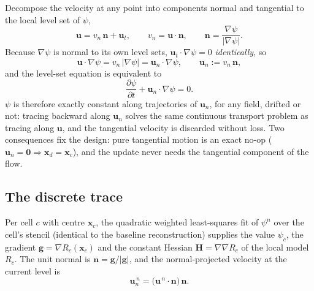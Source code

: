 \documentclass[preprint,3p,11pt]{elsarticle}
\newcommand{\psilev}{\psi}
\newcommand{\xc}{\mathbf{x}_c}
\newcommand{\xd}{\mathbf{x}_d}
\newcommand{\uvec}{\mathbf{u}}
\newcommand{\un}{\mathbf{u}_n}
\newcommand{\nv}{\mathbf{n}}
\newcommand{\gv}{\mathbf{g}}
\newcommand{\Hm}{\mathbf{H}}
\newcommand{\gradpsi}{\lvert\nabla\psilev\rvert}
\begin{document}
Decompose the velocity at any point into components normal and tangential to
the local level set of $\psilev$,
\begin{equation}
  \uvec = v_n\,\nv + \uvec_t,
  \qquad v_n=\uvec\cdot\nv,
  \qquad \nv=\frac{\nabla\psilev}{\gradpsi}.
\end{equation}
Because $\nabla\psilev$ is normal to its own level sets,
$\uvec_t\cdot\nabla\psilev=0$ \emph{identically}, so
\begin{equation}
  \uvec\cdot\nabla\psilev
  = v_n\,\gradpsi
  = \un\cdot\nabla\psilev,
  \qquad \un := v_n\,\nv,
\end{equation}
and the level-set equation is equivalent to
\begin{equation}
  \frac{\partial\psilev}{\partial t} + \un\cdot\nabla\psilev = 0 .
  \label{eq:nsl-pde}
\end{equation}
$\psilev$ is therefore exactly constant along trajectories of $\un$, for any
field, drifted or not: tracing backward along $\un$ solves the same continuous
transport problem as tracing along $\uvec$, and the tangential velocity is
discarded without loss. Two consequences fix the design: pure tangential
motion is an exact no-op ($\un=\mathbf 0\Rightarrow\xd=\xc$), and the update
never needs the tangential component of the flow.

\subsection{The discrete trace}
\label{sec:trace}

Per cell $c$ with centre $\xc$, the quadratic weighted least-squares fit of
$\psilev^{n}$ over the cell's stencil (identical to the baseline
reconstruction) supplies the value $\psilev_c$, the gradient
$\gv=\nabla R_c(\xc)$ and the constant Hessian $\Hm=\nabla\nabla R_c$ of the
local model $R_c$. The unit normal is $\nv=\gv/\lvert\gv\rvert$, and the
normal-projected velocity at the current level is
\begin{equation}
  \un^{\,n} = \bigl(\uvec^{\,n}\cdot\nv\bigr)\,\nv .
\end{equation}
\end{document}
